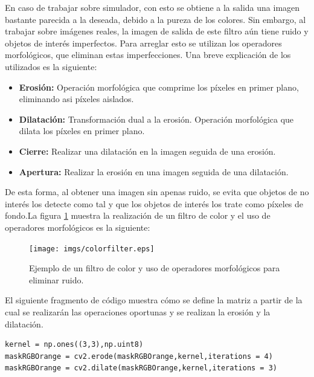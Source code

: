 \hspace{1 cm} En caso de trabajar sobre simulador, con esto se obtiene a la salida una imagen bastante parecida a la deseada, debido a la pureza de los colores. Sin embargo, al trabajar sobre im\'agenes reales, la imagen de salida de este filtro a\'un tiene ruido y objetos de inter\'es imperfectos. Para arreglar esto se utilizan los operadores morfol\'ogicos, que eliminan estas imperfecciones. Una breve explicaci\'on de los utilizados es la siguiente: 

\begin{itemize}
	\item \textbf{Erosi\'on:} Operaci\'on morfol\'ogica que comprime los p\'ixeles en primer plano, eliminando asi p\'ixeles aislados.
	\item \textbf{Dilataci\'on:} Transformaci\'on dual a la erosi\'on. Operaci\'on morfol\'ogica que dilata los p\'ixeles en primer plano.
	\item \textbf{Cierre:} Realizar una dilataci\'on en la imagen seguida de una erosi\'on.
	\item \textbf{Apertura:} Realizar la erosi\'on en una imagen seguida de una dilataci\'on.
\end{itemize}


\hspace{1 cm} De esta forma, al obtener una imagen sin apenas ruido, se evita que objetos de no inter\'es los detecte como tal y que los objetos de inter\'es los trate como p\'ixeles de fondo.La figura \ref{fig:E_Imagen_baliza} muestra la realizaci\'on de un filtro de color y el uso de operadores morfol\'ogicos es la siguiente:

\begin{figure}[ht]
	\centering
		\texttt{[image: imgs/colorfilter.eps]}
         \caption{Ejemplo de un filtro de color y uso de operadores morfol\'ogicos para eliminar ruido.}
	\label{fig:E_Imagen_baliza}
\end{figure}


\hspace{1 cm} El siguiente fragmento de c\'odigo muestra c\'omo se define la matriz a partir de la cual se realizar\'an las operaciones oportunas y se realizan la erosi\'on y la dilataci\'on.
\begin{lstlisting}[backgroundcolor=\color{yellow}]
kernel = np.ones((3,3),np.uint8)
maskRGBOrange = cv2.erode(maskRGBOrange,kernel,iterations = 4)
maskRGBOrange = cv2.dilate(maskRGBOrange,kernel,iterations = 3)
\end{lstlisting}


